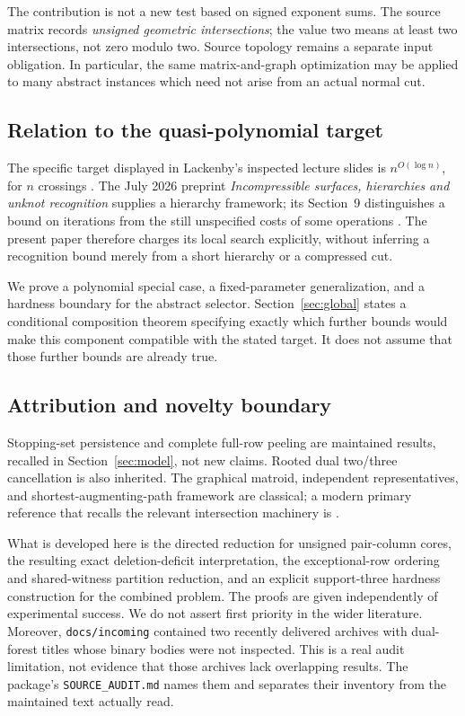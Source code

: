 \documentclass[11pt,letterpaper]{article}
\theoremstyle{definition}
\theoremstyle{remark}
\newcommand{\code}[1]{\nolinkurl{#1}}
\begin{document}
The contribution is not a new test based on signed exponent sums. The source
matrix records \emph{unsigned geometric intersections}; the value two means at
least two intersections, not zero modulo two. Source topology remains a separate
input obligation. In particular, the same matrix-and-graph optimization may be
applied to many abstract instances which need not arise from an actual normal cut.

\subsection{Relation to the quasi-polynomial target}
The specific target displayed in Lackenby's inspected lecture slides is
$n^{O(\log n)}$, for $n$ crossings \cite{lackenby-talk}. The July 2026 preprint
\emph{Incompressible surfaces, hierarchies and unknot recognition} supplies a
hierarchy framework; its Section~9 distinguishes a bound on iterations from the
still unspecified costs of some operations \cite{lackenby2026}. The present paper
therefore charges its local search explicitly, without inferring a recognition
bound merely from a short hierarchy or a compressed cut.

We prove a polynomial special case, a fixed-parameter generalization, and a
hardness boundary for the abstract selector. Section~\ref{sec:global} states a
conditional composition theorem specifying exactly which further bounds would
make this component compatible with the stated target. It does not assume that
those further bounds are already true.

\subsection{Attribution and novelty boundary}
Stopping-set persistence and complete full-row peeling are maintained results,
recalled in Section~\ref{sec:model}, not new claims. Rooted dual two/three
cancellation is also inherited. The graphical matroid, independent representatives,
and shortest-augmenting-path framework are classical; a modern primary reference
that recalls the relevant intersection machinery is \cite{matroid2024}.

What is developed here is the directed reduction for unsigned pair-column cores,
the resulting exact deletion-deficit interpretation, the exceptional-row ordering
and shared-witness partition reduction, and an explicit support-three hardness
construction for the combined problem. The proofs are given independently of
experimental success. We do not assert first priority in the wider literature.
Moreover, \code{docs/incoming} contained two recently delivered archives with
dual-forest titles whose binary bodies were not inspected. This is a real audit
limitation, not evidence that those archives lack overlapping results. The
package's \code{SOURCE_AUDIT.md} names them and separates their inventory from the
maintained text actually read.
\end{document}
